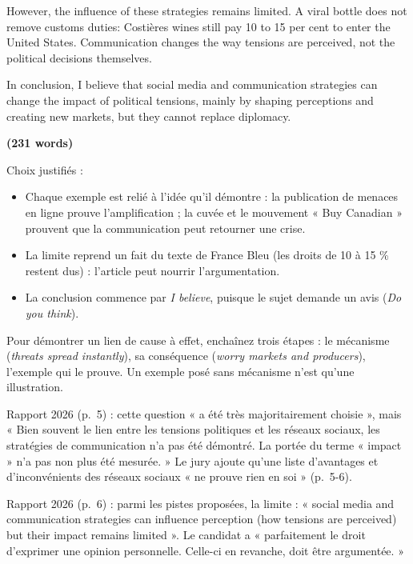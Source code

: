 \documentclass[11pt,a4paper]{article}
\providecommand{\tightlist}{\setlength{\itemsep}{0pt}\setlength{\parskip}{0pt}}
\begin{document}
However, the influence of these strategies remains limited. A viral bottle does not remove customs duties: Costières wines still pay 10 to 15 per cent to enter the United States. Communication changes the way tensions are perceived, not the political decisions themselves.

In conclusion, I believe that social media and communication strategies can change the impact of political tensions, mainly by shaping perceptions and creating new markets, but they cannot replace diplomacy.

\textbf{(231 words)}

Choix justifiés :

\begin{itemize}
\tightlist
\item
  Chaque exemple est relié à l'idée qu'il démontre : la publication de menaces en ligne prouve l'amplification ; la cuvée et le mouvement « Buy Canadian » prouvent que la communication peut retourner une crise.
\item
  La limite reprend un fait du texte de France Bleu (les droits de 10 à 15 \% restent dus) : l'article peut nourrir l'argumentation.
\item
  La conclusion commence par \emph{I believe}, puisque le sujet demande un avis (\emph{Do you think}).
\end{itemize}

\begin{methode}

Pour démontrer un lien de cause à effet, enchaînez trois étapes : le mécanisme (\emph{threats spread instantly}), sa conséquence (\emph{worry markets and producers}), l'exemple qui le prouve. Un exemple posé sans mécanisme n'est qu'une illustration.

\end{methode}

\begin{jury}

Rapport 2026 (p.~5) : cette question « a été très majoritairement choisie », mais « Bien souvent le lien entre les tensions politiques et les réseaux sociaux, les stratégies de communication n'a pas été démontré. La portée du terme « impact » n'a pas non plus été mesurée. » Le jury ajoute qu'une liste d'avantages et d'inconvénients des réseaux sociaux « ne prouve rien en soi » (p.~5-6).

\end{jury}

\begin{jury}

Rapport 2026 (p.~6) : parmi les pistes proposées, la limite : « social media and communication strategies can influence perception (how tensions are perceived) but their impact remains limited ». Le candidat a « parfaitement le droit d'exprimer une opinion personnelle. Celle-ci en revanche, doit être argumentée. »

\end{jury}
\end{document}

